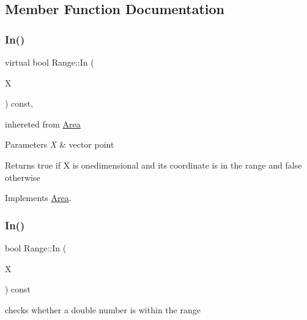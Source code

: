 \subsection{Member Function Documentation}
\mbox{\label{class_range_abaec0363220c4fbedaca148a4790bc9e}} 
\subsubsection{\texorpdfstring{In()}{In()}\hspace{0.1cm}{\footnotesize\ttfamily [1/2]}}
{\footnotesize\ttfamily virtual bool Range\+::\+In (\begin{DoxyParamCaption}\item[{const \hyperlink{classv_point}{v\+Point} \&}]{X }\end{DoxyParamCaption}) const\hspace{0.3cm}{\ttfamily [inline]}, {\ttfamily [virtual]}}

inhereted from \hyperlink{class_area}{Area} 
\begin{DoxyParams}{Parameters}
{\em X} & vector point \\
\hline
\end{DoxyParams}
\begin{DoxyReturn}{Returns}
true if X is onedimensional and its coordinate is in the range and false otherwise 
\end{DoxyReturn}


Implements \hyperlink{class_area_a08775973fcf205fb91654b25a08f6bea}{Area}.

\mbox{\label{class_range_a2d76a15c78b08d8c14dd076b630ee1eb}} 
\subsubsection{\texorpdfstring{In()}{In()}\hspace{0.1cm}{\footnotesize\ttfamily [2/2]}}
{\footnotesize\ttfamily bool Range\+::\+In (\begin{DoxyParamCaption}\item[{double}]{X }\end{DoxyParamCaption}) const\hspace{0.3cm}{\ttfamily [inline]}}



checks whether a double number is within the range 

